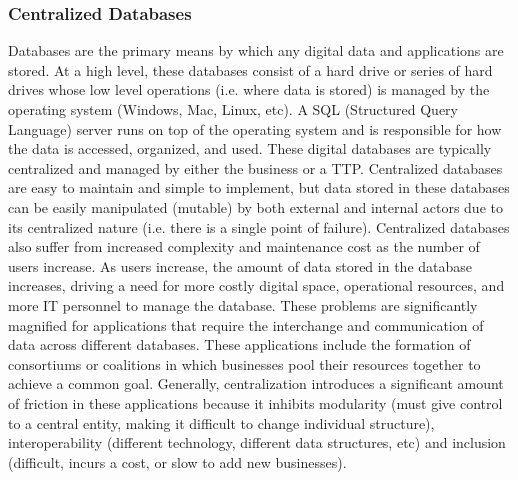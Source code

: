 \subsubsection{Centralized Databases}
Databases are the primary means by which any digital data and applications are stored. At a high level, these databases consist of a hard drive or series of hard drives whose low level operations (i.e. where data is stored) is managed by the operating system (Windows, Mac, Linux, etc). A SQL (Structured Query Language) server runs on top of the operating system and is responsible for how the data is accessed, organized, and used. These digital databases are typically centralized and managed by either the business or a TTP. Centralized databases are easy to maintain and simple to implement, but data stored in these databases can be easily manipulated (mutable) by both external and internal actors due to its centralized nature (i.e. there is a single point of failure). Centralized databases also suffer from increased complexity and maintenance cost as the number of users increase. As users increase, the amount of data stored in the database increases, driving a need for more costly digital space, operational resources, and more IT personnel to manage the database. These problems are significantly magnified for applications that require the interchange and communication of data across different databases. These applications include the formation of consortiums or coalitions in which businesses pool their resources together to achieve a common goal. Generally, centralization introduces a significant amount of friction in these applications because it inhibits modularity (must give control to a central entity, making it difficult to change individual structure), interoperability (different technology, different data structures, etc) and inclusion (difficult, incurs a cost, or slow to add new businesses).
